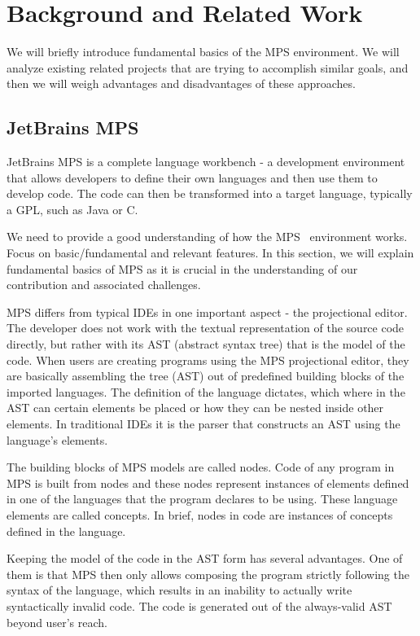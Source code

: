 \section{Background and Related Work}

We will briefly introduce fundamental basics of the MPS environment.
We will analyze existing related projects that are trying to accomplish similar goals, and then we will weigh advantages and disadvantages of these approaches.

\subsection{JetBrains MPS}

 JetBrains MPS is a complete language workbench - a development environment that allows developers to define their own languages and then use them to develop code. The code can then be transformed into a target language, typically a GPL, such as Java or C.

 We need to provide a good understanding of how the MPS~\cite{ref:MPS} environment works.
Focus on basic/fundamental and relevant features. In this section, we will explain fundamental basics of MPS as it is crucial in the understanding of our contribution and associated challenges.

 MPS differs from typical IDEs in one important aspect - the projectional editor. The developer does not work with the textual representation of the source code directly, but rather with its AST (abstract syntax tree) that is the model of the code. When users are creating programs using the MPS projectional editor, they are basically assembling the tree (AST) out of predefined building blocks of the imported languages. The definition of the language dictates, which where in the AST can certain elements be placed or how they can be nested inside other elements. In traditional IDEs it is the parser that constructs an AST using the language's elements.

 The building blocks of MPS models are called nodes. Code of any program in MPS is built from nodes and these nodes represent instances of elements defined in one of the languages that the program declares to be using. These language elements are called concepts. In brief, nodes in code are instances of concepts defined in the language.

Keeping the model of the code in the AST form has several advantages.
One of them is that MPS then only allows composing the program strictly following the syntax of the language, which results in an inability to actually write syntactically invalid code.
The code is generated out of the always-valid AST beyond user's reach.

